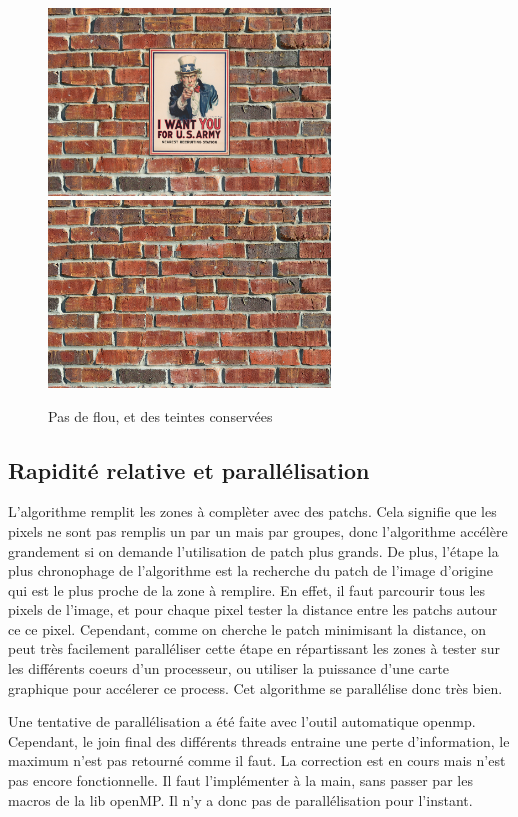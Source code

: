 \begin{figure}[ht]
\centering
\includegraphics[width=7.5cm]{img/examples/wall.jpg}
\includegraphics[width=7.5cm]{img/examples/wall_res.jpg}
\caption{Pas de flou, et des teintes conservées}
\end{figure}

\subsection{Rapidité relative et parallélisation}
L'algorithme remplit les zones à complèter avec des patchs. Cela signifie que
les pixels ne sont pas remplis un par un mais par groupes, donc l'algorithme
accélère grandement si on demande l'utilisation de patch plus grands.
De plus, l'étape la plus chronophage de l'algorithme est la recherche du 
patch de l'image d'origine qui est le plus proche de la zone à remplire.
En effet, il faut parcourir tous les pixels de l'image, et pour chaque
pixel tester la distance entre les patchs autour ce ce pixel. Cependant,
comme on cherche le patch minimisant la distance, on peut très facilement
paralléliser cette étape en répartissant les zones à tester sur les 
différents coeurs d'un processeur, ou utiliser la puissance d'une carte graphique
pour accélerer ce process.
Cet algorithme se parallélise donc très bien.

Une tentative de parallélisation a été faite avec l'outil automatique openmp.
Cependant, le join final des différents threads entraine une perte d'information,
le maximum n'est pas retourné comme il faut. La correction est en cours mais 
n'est pas encore fonctionnelle. Il faut l'implémenter à la main, sans passer
par les macros de la lib openMP. Il n'y a donc pas de parallélisation pour l'instant.

